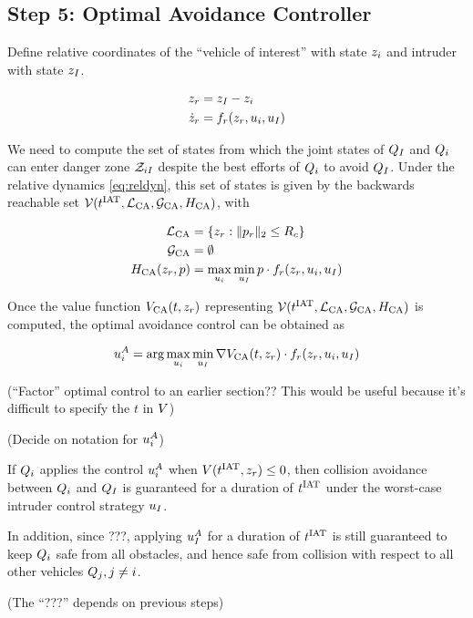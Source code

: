 \subsection{Step 5: Optimal Avoidance Controller}
Define relative coordinates of the ``vehicle of interest'' with state $z_i$ and intruder with state $z_I$.

\begin{equation}
\label{eq:reldyn}
\begin{aligned}
z_r &= z_I - z_i \\
\dot {z}_r &= f_r(z_r, u_i, u_I)
\end{aligned}
\end{equation}

We need to compute the set of states from which the joint states of $Q_{I}$ and $Q_{i}$ can enter danger zone $\mathcal{Z}_{iI}$ despite the best efforts of $Q_{i}$ to avoid $Q_{I}$. Under the relative dynamics \eqref{eq:reldyn}, this set of states is given by the backwards reachable set $\mathcal{V}(t^\text{IAT}, \mathcal{L}_\text{CA}, \mathcal{G}_\text{CA}, H_\text{CA})$, with

\begin{equation}
\begin{aligned}
\mathcal{L}_\text{CA} &= \{z_r: \|p_r\|_2 \le R_c\} \\
\mathcal{G}_\text{CA} &= \emptyset \\
H_\text{CA}(z_r, p) &= \max_{u_i} \min_{u_I} p \cdot f_r(z_r, u_i, u_I)
\end{aligned}
\end{equation}

Once the value function $V_\text{CA}(t, z_r)$ representing $\mathcal{V}(t^\text{IAT}, \mathcal{L}_\text{CA}, \mathcal{G}_\text{CA}, H_\text{CA})$ is computed, the optimal avoidance control can be obtained as 

\begin{equation}
u_i^A = \arg \max_{u_i} \min_{u_I} \nabla V_\text{CA}(t,z_r) \cdot f_r(z_r, u_i, u_I)
\end{equation}

(``Factor'' optimal control to an earlier section?? This would be useful because it's difficult to specify the $t$ in $V$)

(Decide on notation for $u_i^A$)

If $Q_{i}$ applies the control $u_i^A$ when $V(t^\text{IAT}, z_r) \le 0$, then collision avoidance between $Q_{i}$ and $Q_{I}$ is guaranteed for a duration of $t^\text{IAT}$ under the worst-case intruder control strategy $u_I$.

In addition, since ???, applying $u_I^A$ for a duration of $t^\text{IAT}$ is still guaranteed to keep $Q_{i}$ safe from all obstacles, and hence safe from collision with respect to all other vehicles $Q_{j}, j \neq i$.

(The ``???'' depends on previous steps)